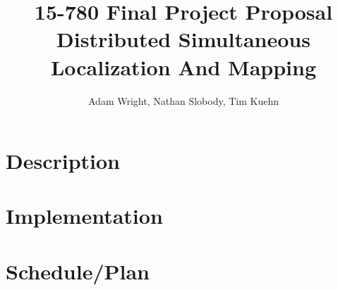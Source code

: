 \documentclass[11pt]{article}
\title{
15-780 Final Project Proposal \\ 
Distributed Simultaneous Localization And Mapping \\
}
\author{Adam Wright, Nathan Slobody, Tim Kuehn}
\begin{document}
\maketitle

\section{Description}

\section{Implementation}

\section{Schedule/Plan}
\end{document}
